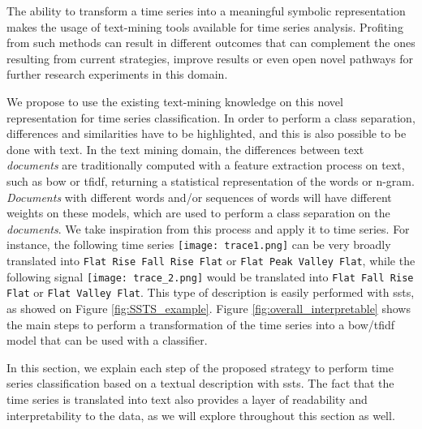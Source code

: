The ability to transform a time series into a meaningful symbolic representation makes the usage of text-mining tools available for time series analysis. Profiting from such methods can result in different outcomes that can complement the ones resulting from current strategies, improve results or even open novel pathways for further research experiments in this domain.

We propose to use the existing text-mining knowledge on this novel representation for time series classification. In order to perform a class separation, differences and similarities have to be highlighted, and this is also possible to be done with text. In the text mining domain, the differences between text \textit{documents} are traditionally computed with a feature extraction process on text, such as \gls{bow} or \gls{tfidf}, returning a statistical representation of the words or n-gram. \textit{Documents} with different words and/or sequences of words will have different weights on these models, which are used to perform a class separation on the \textit{documents}. We take inspiration from this process and apply it to time series. For instance, the following time series \texttt{[image: trace1.png]} can be very broadly translated into \texttt{Flat Rise Fall Rise Flat} or \texttt{Flat Peak Valley Flat}, while the following signal \texttt{[image: trace\_2.png]} would be translated into \texttt{Flat Fall Rise Flat} or \texttt{Flat Valley Flat}. This type of description is easily performed with \gls{ssts}, as showed on Figure \ref{fig:SSTS_example}. Figure \ref{fig:overall_interpretable} shows the main steps to perform a transformation of the time series into a \gls{bow}/\gls{tfidf} model that can be used with a classifier. 

In this section, we explain each step of the proposed strategy to perform time series classification based on a textual description with \gls{ssts}. The fact that the time series is translated into text also provides a layer of readability and interpretability to the data, as we will explore throughout this section as well.

